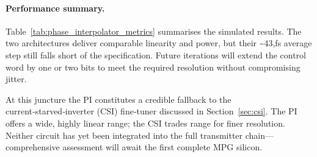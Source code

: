 \paragraph{Performance summary.} Table~\ref{tab:phase_interpolator_metrics} summarises the simulated results. The two architectures deliver comparable linearity and power, but their \textasciitilde43,fs average step still falls short of the specification. Future iterations will extend the control word by one or two bits to meet the required resolution without compromising jitter.

At this juncture the PI constitutes a credible fallback to the current‑starved‑inverter (CSI) fine‑tuner discussed in Section~\ref{sec:csi}. The PI offers a wide, highly linear range; the CSI trades range for finer resolution. Neither circuit has yet been integrated into the full transmitter chain—comprehensive assessment will await the first complete MPG silicon.


